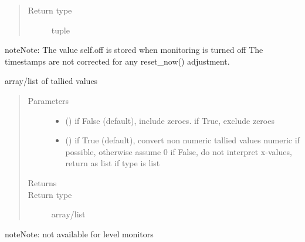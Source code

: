 \documentclass[letterpaper,10pt,english]{sphinxmanual}
\begin{document}
\begin{fulllineitems}
\begin{fulllineitems}
\begin{quote}
\begin{description}
\item[{Return type}] \leavevmode
tuple

\end{description}\end{quote}

\begin{sphinxadmonition}{note}{Note:}
The value self.off is stored when monitoring is turned off 
The timestamps are not corrected for any reset\_now() adjustment.
\end{sphinxadmonition}

\end{fulllineitems}


\begin{fulllineitems}
\label{\detokenize{Reference:salabim.Monitor.xweight}}
array/list of tallied values
\begin{quote}\begin{description}
\item[{Parameters}] \leavevmode\begin{itemize}
\item {} 
 () \textendash{} if False (default), include zeroes. if True, exclude zeroes

\item {} 
 () \textendash{} if True (default), convert non numeric tallied values numeric if possible, otherwise assume 0 
if False, do not interpret x-values, return as list if type is list

\end{itemize}

\item[{Returns}] \leavevmode
{}

\item[{Return type}] \leavevmode
array/list

\end{description}\end{quote}

\begin{sphinxadmonition}{note}{Note:}
not available for level monitors
\end{sphinxadmonition}

\end{fulllineitems}


\end{fulllineitems}
\end{document}
